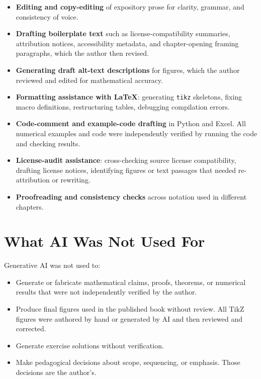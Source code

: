 \begin{itemize}
  \item \textbf{Editing and copy-editing} of expository prose for
    clarity, grammar, and consistency of voice.
  \item \textbf{Drafting boilerplate text} such as license-compatibility
    summaries, attribution notices, accessibility metadata, and
    chapter-opening framing paragraphs, which the author then revised.
  \item \textbf{Generating draft alt-text descriptions} for figures,
    which the author reviewed and edited for mathematical accuracy.
  \item \textbf{Formatting assistance with \LaTeX{}}: generating
    \texttt{tikz} skeletons, fixing macro definitions, restructuring
    tables, debugging compilation errors.
  \item \textbf{Code-comment and example-code drafting} in Python and Excel. All numerical examples and code were independently verified
    by running the code and checking results.
  \item \textbf{License-audit assistance}: cross-checking source
    license compatibility, drafting license notices, identifying
    figures or text passages that needed re-attribution or rewriting.
  \item \textbf{Proofreading and consistency checks} across notation
    used in different chapters.
\end{itemize}

\section*{What AI Was Not Used For}

Generative AI was not used to:

\begin{itemize}
  \item Generate or fabricate mathematical claims, proofs, theorems,
    or numerical results that were not independently verified by the
    author.
  \item Produce final figures used in the published book without
    review. All TikZ figures were authored by hand or generated by AI
    and then reviewed and corrected.
  \item Generate exercise solutions without verification.
  \item Make pedagogical decisions about scope, sequencing, or
    emphasis. Those decisions are the author's.
\end{itemize}

